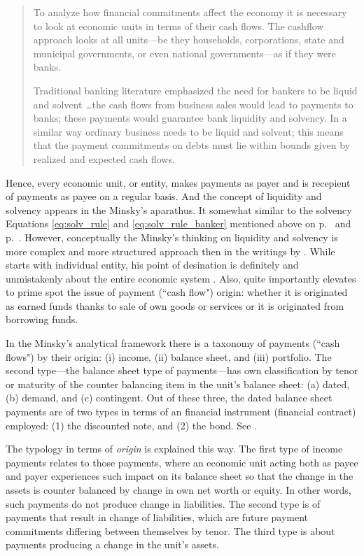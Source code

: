 \begin{quote}
To analyze how financial commitments affect the economy it is necessary to look at economic units in terms of their cash flows. The cashflow approach looks at all units---be they households, corporations, state and municipal governments, or even national governments---as if they were banks.\par Traditional banking literature emphasized the need for bankers to be liquid and solvent \dots the cash flows from business sales would lead to payments to banks; these payments would guarantee bank liquidity and solvency. In a similar way ordinary business needs to be liquid and solvent; this means that the payment commitments on debts must lie within bounds given by realized and expected cash flows.~\citep[p.~221]{minsky1986}
\end{quote}

Hence, every economic unit, or entity, makes payments as payer and is recepient of payments as payee on a regular basis. And the concept of liquidity and solvency appears in the Minsky's aparathus. It somewhat similar to the solvency Equations \ref{eq:solv_rule} and \ref{eq:solv_rule_banker} mentioned above on p.~\pageref{eq:solv_rule} and p.~\pageref{eq:solv_rule_banker}. However, conceptually the Minsky's thinking on liquidity and solvency is more complex and more structured approach then in the writings by \citeauthor{innes1913}. While \citeauthor{minsky1986} starts with individual entity, his point of desination is definitely and unmistakenly about the entire economic system \citep{bezemer2021}. Also, quite importantly \citeauthor{minsky1986} elevates to prime spot the issue of payment (``cash flow") origin: whether it is originated as earned funds thanks to sale of own goods or services or it is originated from borrowing funds.

In the Minsky's analytical framework there is a taxonomy of payments (``cash flows") by their origin: (i) income, (ii) balance sheet, and (iii) portfolio. The second type---the balance sheet type of payments---has own classification by tenor or maturity of the counter balancing item in the unit's balance sheet: (a) dated, (b) demand, and (c) contingent. Out of these three, the dated balance sheet payments are of two types in terms of an financial instrument (financial contract) employed: (1) the discounted note, and (2) the bond. See \citep[pp.~223-227]{minsky1986}. 

The typology in terms of \textit{origin} is explained this way. The first type of income payments relates to those payments, where an economic unit acting both as payee and payer experiences such impact on its balance sheet so that the change in the assets is counter balanced by change in own net worth or equity. In other words, such payments do not produce change in liabilities. The second type is of payments that result in change of liabilities, which are future payment commitments differing between themselves by tenor. The third type is about payments producing a change in the unit's assets.

